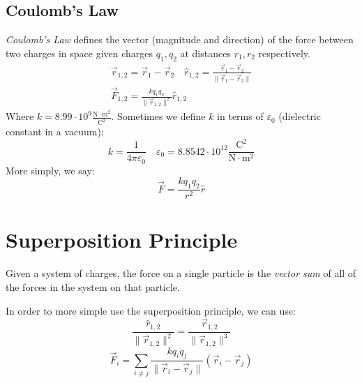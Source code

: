 \documentclass[00_complete]{subfiles}
\begin{document}
\subsection{Coulomb's Law}
\begin{definition}
    \emph{Coulomb's Law} defines the vector (magnitude and direction) of the
    force between two charges in space given charges $q_1, q_2$ at distances
    $r_1, r_2$ respectively.
    \begin{gather*}
        \vec r_{1,2}=\vec r_1 - \vec r_2 \quad \hat r_{1,2}=\frac{\vec r_1 -
        \vec r_2}{\|\vec r_1 - \vec r_2\|} \\
        \vec F_{1,2}= \frac{kq_1q_2}{\|\vec r_{1,2}\|^2}\hat r_{1,2}
    \end{gather*}
    Where $k=8.99\cdot 10^9 \frac{\mathrm{N}\cdot \mathrm{m}^2}{\mathrm{C}^2}$.
    Sometimes we define $k$ in terms of $\varepsilon_0$ (dielectric constant in a
    vacuum):
    $$k=\frac{1}{4\pi\varepsilon_0} \quad \varepsilon_0=8.8542\cdot
    10^{12}\frac{\mathrm{C}^2}{\mathrm{N}\cdot\mathrm{m}^2}$$
    More simply, we say:
    $$\vec F = \frac{kq_1q_2}{r^2}\hat r$$
\end{definition}
\section{Superposition Principle}

\begin{definition}
    Given a system of charges, the force on a single particle is the
    \emph{vector sum} of all of the forces in the system on that particle.
\end{definition}
In order to more simple use the superposition principle, we can use:
$$\frac{\hat r_{1,2}}{\|\vec r_{1,2}\|^2}=\frac{\vec r_{1,2}}{\|\vec r_{1,2}\|^3}$$
$$\vec F_i=\sum_{i\neq j}\frac{kq_iq_j}{\|\vec r_i-\vec r_j\|}(\vec r_i - \vec
r_j)$$
\end{document}
